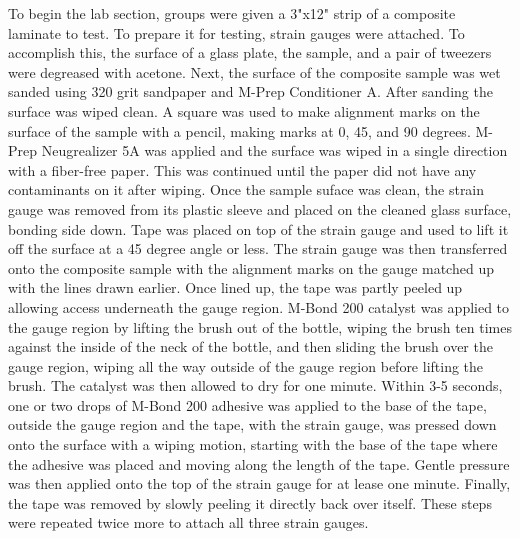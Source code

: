 \documentclass[12pt]{article}
\begin{document}
To begin the lab section, groups were given a 3"x12" strip of a composite laminate to test. To prepare it for testing, strain gauges were attached. To accomplish this, the surface of a glass plate, the sample, and a pair of tweezers were degreased with acetone. Next, the surface of the composite sample was wet sanded using 320 grit sandpaper and M-Prep Conditioner A. After sanding the surface was wiped clean. A square was used to make alignment marks on the surface of the sample with a pencil, making marks at 0, 45, and 90 degrees. M-Prep Neugrealizer 5A was applied and the surface was wiped in a single direction with a fiber-free paper. This was continued until the paper did not have any contaminants on it after wiping. Once the sample suface was clean, the strain gauge was removed from its plastic sleeve and placed on the cleaned glass surface, bonding side down. Tape was placed on top of the strain gauge and used to lift it off the surface at a 45 degree angle or less. The strain gauge was then transferred onto the composite sample with the alignment marks on the gauge matched up with the lines drawn earlier. Once lined up, the tape was partly peeled up allowing access underneath the gauge region. M-Bond 200 catalyst was applied to the gauge region by lifting the brush out of the bottle, wiping the brush ten times against the inside of the neck of the bottle, and then sliding the brush over the gauge region, wiping all the way outside of the gauge region before lifting the brush. The catalyst was then allowed to dry for one minute. Within 3-5 seconds, one or two drops of M-Bond 200 adhesive was applied to the base of the tape, outside the gauge region and the tape, with the strain gauge, was pressed down onto the surface with a wiping motion, starting with the base of the tape where the adhesive was placed and moving along the length of the tape. Gentle pressure was then applied onto the top of the strain gauge for at lease one minute. Finally, the tape was removed by slowly peeling it directly back over itself. These steps were repeated twice more to attach all three strain gauges.
\end{document}

